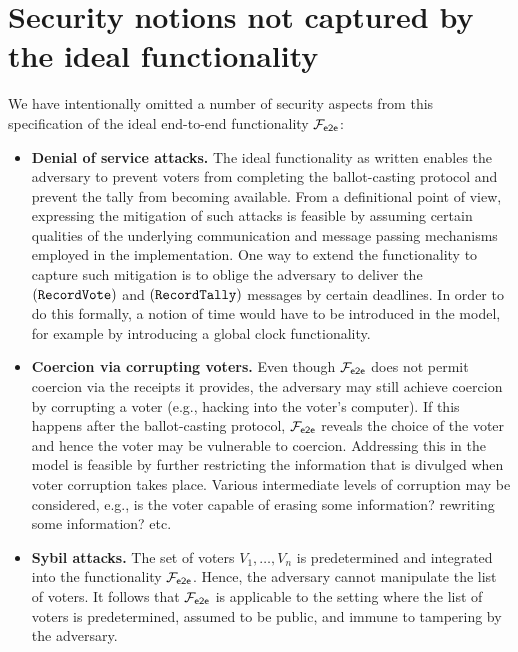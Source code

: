 \section{Security notions not captured by the ideal functionality}

We have intentionally omitted a number of security aspects from this
specification of the ideal end-to-end functionality $\mathcal{F}_{\mathsf{e2e}}$:

\begin{itemize}
\item \textbf{Denial of service attacks.} The ideal functionality as
  written enables the adversary to prevent voters from completing the
  ballot-casting protocol and prevent the tally from becoming
  available. From a definitional point of view, expressing the
  mitigation of such attacks is feasible by assuming certain qualities
  of the underlying communication and message passing mechanisms
  employed in the implementation. One way to extend the functionality
  to capture such mitigation is to oblige the adversary to deliver the
  $(\mathtt{RecordVote})$ and $(\mathtt{RecordTally})$ messages by certain
  deadlines. In order to do this formally, a notion of time would have
  to be introduced in the model, for example by introducing a global
  clock functionality.

\item \textbf{Coercion via corrupting voters.} Even though $\mathcal{F}_{\mathsf{e2e}}$
  does not permit coercion via the receipts it provides, the adversary
  may still achieve coercion by corrupting a voter (e.g., hacking into
  the voter's computer). If this happens after the ballot-casting
  protocol, $\mathcal{F}_{\mathsf{e2e}}$ reveals the choice of the voter and hence the
  voter may be vulnerable to coercion.  Addressing this in the model
  is feasible by further restricting the information that is divulged
  when voter corruption takes place. Various intermediate levels of
  corruption may be considered, e.g., is the voter capable of erasing
  some information? rewriting some information? etc.

\item \textbf{Sybil attacks.} The set of voters $V_1,\ldots,V_n$ is
  predetermined and integrated into the functionality $\mathcal{F}_{\mathsf{e2e}}$. Hence,
  the adversary cannot manipulate the list of voters.  It follows that
  $\mathcal{F}_{\mathsf{e2e}}$ is applicable to the setting where the list of voters is
  predetermined, assumed to be public, and immune to tampering by the
  adversary. 
\end{itemize}